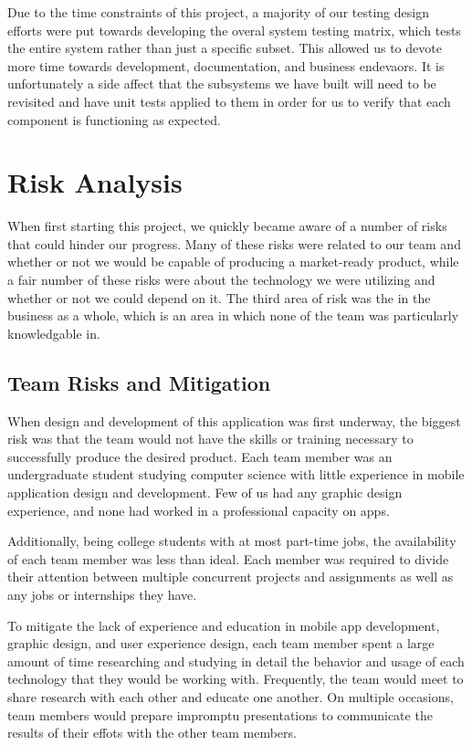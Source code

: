 Due to the time constraints of this project, a majority of our testing design
efforts were put towards developing the overal system testing matrix, which
tests the entire system rather than just a specific subset. This allowed us to
devote more time towards development, documentation, and business endevaors. It
is unfortunately a side affect that the subsystems we have built will need to be
revisited and have unit tests applied to them in order for us to verify that
each component is functioning as expected.


\section{Risk Analysis}

When first starting this project, we quickly became aware of a number of risks
that could hinder our progress. Many of these risks were related to our team and
whether or not we would be capable of producing a market-ready product, while
a fair number of these risks were about the technology we were utilizing and
whether or not we could depend on it. The third area of risk was the in the
business as a whole, which is an area in which none of the team was particularly
knowledgable in.


\subsection{Team Risks and Mitigation}

When design and development of this application was first underway, the biggest
risk was that the team would not have the skills or training necessary to
successfully produce the desired product. Each team member was an undergraduate
student studying computer science with little experience in mobile application
design and development. Few of us had any graphic design experience, and none
had worked in a professional capacity on apps.

Additionally, being college students with at most part-time jobs, the
availability of each team member was less than ideal. Each member was required
to divide their attention between multiple concurrent projects and assignments
as well as any jobs or internships they have.

To mitigate the lack of experience and education in mobile app development,
graphic design, and user experience design, each team member spent a large
amount of time researching and studying in detail the behavior and usage of each
technology that they would be working with. Frequently, the team would meet to
share research with each other and educate one another. On multiple occasions,
team members would prepare impromptu presentations to communicate the results
of their effots with the other team members.

